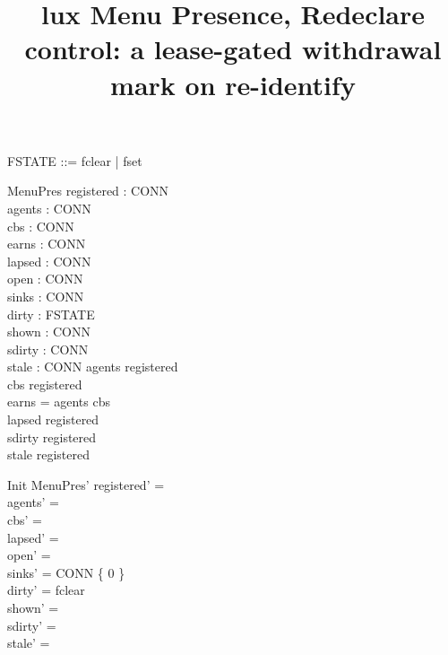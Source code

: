 \documentclass[a4paper,10pt,fleqn]{article}
\begin{document}
\title{lux Menu Presence, Redeclare control: a lease-gated withdrawal mark on re-identify}
\maketitle

\begin{zed}
  [CONN]
\end{zed}

\begin{zed}
  FSTATE ::= fclear | fset
\end{zed}

\begin{schema}{MenuPres}
  registered : \power CONN \\
  agents : \power CONN \\
  cbs : \power CONN \\
  earns : \power CONN \\
  lapsed : \power CONN \\
  open : \power CONN \\
  sinks : CONN   \\
  dirty : FSTATE \\
  shown : \power CONN \\
  sdirty : \power CONN \\
  stale : \power CONN
\where
  agents \subseteq registered \\
  cbs \subseteq registered \\
  earns = agents \cup cbs \\
  lapsed \subseteq registered \\
  sdirty \subseteq registered \\
  stale \subseteq registered
\end{schema}

\begin{schema}{Init}
  MenuPres'
\where
  registered' = \emptyset \\
  agents' = \emptyset \\
  cbs' = \emptyset \\
  lapsed' = \emptyset \\
  open' = \emptyset \\
  sinks' = CONN \cross \{ 0 \} \\
  dirty' = fclear \\
  shown' = \emptyset \\
  sdirty' = \emptyset \\
  stale' = \emptyset
\end{schema}
\end{document}
